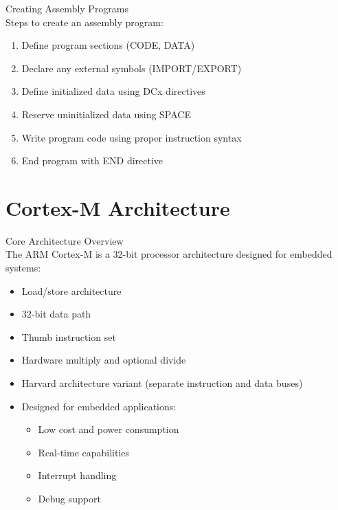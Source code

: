 \begin{KR}{Creating Assembly Programs}\\
Steps to create an assembly program:
\begin{enumerate}
  \item Define program sections (CODE, DATA)
  \item Declare any external symbols (IMPORT/EXPORT)
  \item Define initialized data using DCx directives
  \item Reserve uninitialized data using SPACE
  \item Write program code using proper instruction syntax
  \item End program with END directive
\end{enumerate}
\end{KR}

\section{Cortex-M Architecture}

\begin{concept}{Core Architecture Overview}\\
The ARM Cortex-M is a 32-bit processor architecture designed for embedded systems:
\begin{itemize}
  \item Load/store architecture
  \item 32-bit data path
  \item Thumb instruction set
  \item Hardware multiply and optional divide
  \item Harvard architecture variant (separate instruction and data buses)
  \item Designed for embedded applications:
    \begin{itemize}
      \item Low cost and power consumption
      \item Real-time capabilities
      \item Interrupt handling
      \item Debug support
    \end{itemize}
\end{itemize}
\end{concept}

